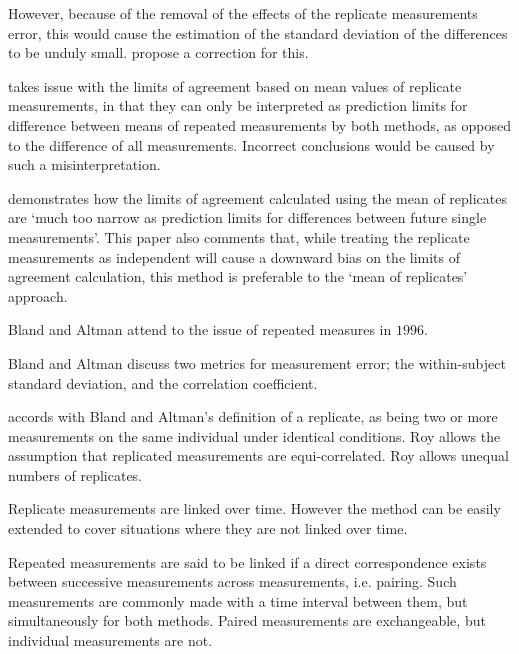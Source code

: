 \documentclass[12pt, a4paper]{report}
\theoremstyle{plain}
\theoremstyle{definition}
\theoremstyle{remark}
\begin{document}
	
	However, because of the removal of the effects of the replicate
	measurements error, this would cause the estimation of the
	standard deviation of the differences to be unduly small.
	\citet*{BA86} propose a correction for this.
	
	\citet{BXC2008} takes issue with the limits of agreement based on
	mean values of replicate measurements, in that they can only be interpreted as prediction
	limits for difference between means of repeated measurements by
	both methods, as opposed to the difference of all measurements.
	Incorrect conclusions would be caused by such a misinterpretation.
	
	\citet{BXC2008} demonstrates how the limits of agreement
	calculated using the mean of replicates are `much too narrow as
	prediction limits for differences between future single
	measurements'. This paper also comments that, while treating the
	replicate measurements as independent will cause a downward bias
	on the limits of agreement calculation, this method is preferable
	to the `mean of replicates' approach.
	
	Bland and Altman attend to the issue of repeated measures in
	$1996$.

	
	Bland and Altman discuss two metrics for measurement error; the 	within-subject standard deviation, and the correlation
	coefficient.
%	
	
	\citet{ARoy2009} accords with Bland and Altman's definition of a replicate, as being two or more measurements on the same individual under identical conditions. 	Roy allows the assumption that replicated measurements are equi-correlated.
	Roy allows unequal numbers of replicates.
	
	
	Replicate measurements are linked over time. However the method can be easily extended to cover situations where they are not linked over time.
	
	Repeated measurements are said to be linked if a direct correspondence exists between successive measurements across measurements, i.e. pairing. Such measurements are commonly made with a time interval between them, but simultaneously for both methods. Paired measurements are exchangeable, but individual measurements are not.
	
\end{document}
